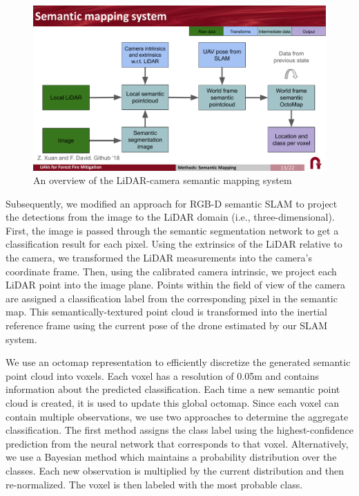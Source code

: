 \begin{figure}
    \centering
    \includegraphics[width=\textwidth, clip, trim={0 1.5cm 0 1.8cm}]{figs/methods/semantic_mapping/semantic_mapping_overview.pdf}
    \caption{An overview of the LiDAR-camera semantic mapping system}
    \label{fig:lidar-camera-semantic-mapping}
\end{figure}

Subsequently, we modified an approach for RGB-D semantic SLAM \cite{semantic_slam} to project the detections from the image to the LiDAR domain (i.e., three-dimensional). First, the image is passed through the semantic segmentation network to get a classification result for each pixel. Using the extrinsics of the LiDAR relative to the camera, we transformed the LiDAR measurements into the camera's coordinate frame. Then, using the calibrated camera intrinsic, we project each LiDAR point into the image plane. Points within the field of view of the camera are assigned a classification label from the corresponding pixel in the semantic map. This semantically-textured point cloud is transformed into the inertial reference frame using the current pose of the drone estimated by our SLAM system. 

We use an octomap \cite{hornung13auro} representation to efficiently discretize the generated semantic point cloud into voxels. Each voxel has a resolution of 0.05m and contains information about the predicted classification. Each time a new semantic point cloud is created, it is used to update this global octomap. Since each voxel can contain multiple observations, we use two approaches to determine the aggregate classification. The first method assigns the class label using the highest-confidence prediction from the neural network that corresponds to that voxel. Alternatively, we use a Bayesian method which maintains a probability distribution over the classes. Each new observation is multiplied by the current distribution and then re-normalized. The voxel is then labeled with the most probable class.

